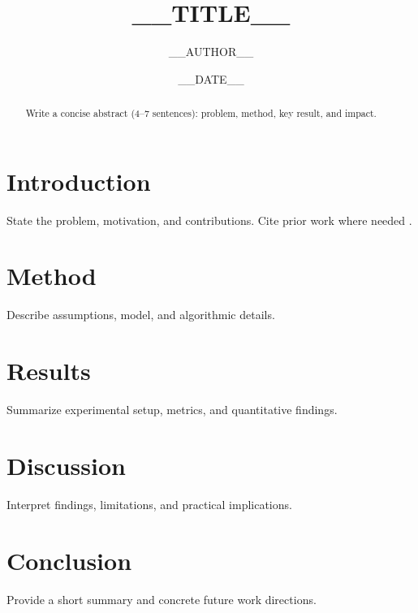 \documentclass[11pt]{article}
\title{__TITLE__}
\author{__AUTHOR__}
\date{__DATE__}
\begin{document}
\maketitle

\begin{abstract}
Write a concise abstract (4--7 sentences): problem, method, key result, and impact.
\end{abstract}

\section{Introduction}
State the problem, motivation, and contributions. Cite prior work where needed \citep{lamport1994}.

\section{Method}
Describe assumptions, model, and algorithmic details.

\section{Results}
Summarize experimental setup, metrics, and quantitative findings.

\section{Discussion}
Interpret findings, limitations, and practical implications.

\section{Conclusion}
Provide a short summary and concrete future work directions.



\end{document}
